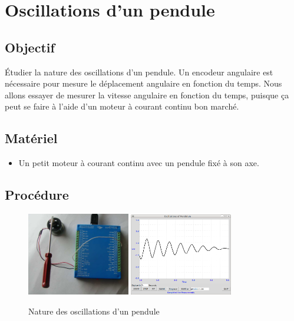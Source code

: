 \documentclass{book}
\begin{document}




\section{Oscillations d'un pendule}



\subsection{Objectif}


Étudier la nature des oscillations d'un pendule. Un encodeur angulaire est nécessaire pour mesure le déplacement angulaire en fonction du temps. Nous allons essayer de mesurer la vitesse angulaire en fonction du temps, puisque ça peut se faire à l'aide d'un moteur à courant continu bon marché.




\subsection{Matériel}


\begin{itemize}
  \item Un petit moteur à courant continu avec un pendule fixé à son axe.
\end{itemize}

\subsection{Procédure}


\begin{figure}[h!]
\begin{center}
\caption{\label{}Nature des oscillations d'un pendule }\vspace{0.5em}
\includegraphics[width=0.4\textwidth, height=0.3\textwidth, keepaspectratio]{Schematic-pendulum-photo.png}
\includegraphics[width=0.4\textwidth, height=0.3\textwidth, keepaspectratio]{Pic-pendulum-osc.png}
\end{center}
\end{figure}
\end{document}
